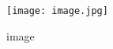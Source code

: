 \documentclass{article}
\begin{document}
\section{\color{green}{Image}}
\begin{figure}[h]
 \texttt{[image: image.jpg]}
 \caption{image}
 \end{figure}
    
\end{document}
